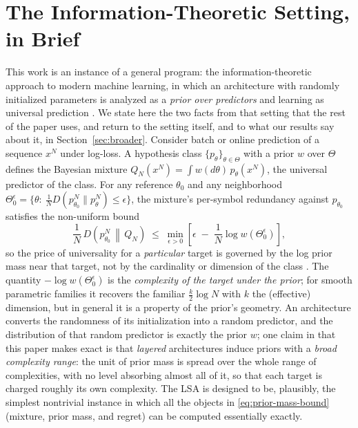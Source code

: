 \documentclass[11pt]{article}
\newcommand{\KL}{D}
\newcommand{\Nseq}{N}
\begin{document}
\section{The Information-Theoretic Setting, in Brief}
\label{sec:framework}
This work is an instance of a general program: the information-theoretic
approach to modern machine learning, in which an architecture with randomly
initialized parameters is analyzed as a \emph{prior over predictors} and
learning as universal prediction \cite{feder1992universal,MerhavFeder1998,feder2025framework}.
We state here the two facts from that setting that the rest of the paper
uses, and return to the setting itself, and to what our results say about
it, in Section~\ref{sec:broader}.
Consider batch or online prediction of a sequence \(x^\Nseq\) under log-loss.
A hypothesis class \(\{p_\theta\}_{\theta\in\Theta}\) with a prior \(w\) over
\(\Theta\) defines the Bayesian mixture
\(Q_\Nseq(x^\Nseq)=\int w(d\theta)\,p_\theta(x^\Nseq)\), the universal
predictor of the class.  For any reference \(\theta_0\) and any neighborhood
\(\Theta_0^{\epsilon}=\{\theta:\ \tfrac1\Nseq
\KL(p_{\theta_0}^\Nseq\|p_\theta^\Nseq)\le\epsilon\}\), the mixture's
per-symbol redundancy against \(p_{\theta_0}\) satisfies the non-uniform bound
\begin{equation}
\label{eq:prior-mass-bound}
  \frac1\Nseq\,\KL\!\left(p_{\theta_0}^\Nseq\,\middle\|\,Q_\Nseq\right)
  \;\le\;
\min_{\epsilon > 0}  \left[ \epsilon
  \;-\;
  \frac1\Nseq\log w\!\left(\Theta_0^{\epsilon}\right) \right ],
\end{equation}
so the price of universality for a \emph{particular} target is governed by
the log prior mass near that target, not by the cardinality or dimension of
the class \cite{feder1992universal,MerhavFeder1998,feder2025framework}.  The quantity
\(-\log w(\Theta_0^{\epsilon})\) is the \emph{complexity of the target under
the prior}; for smooth parametric families it recovers the familiar
\(\frac{k}{2}\log \Nseq\) with \(k\) the (effective) dimension, but in general
it is a property of the prior’s geometry.
An architecture converts the randomness of its initialization into a random
predictor, and the distribution of that random predictor is exactly the
prior \(w\); one claim in \cite{feder2025framework} that this paper makes
exact is that \emph{layered} architectures induce priors with a \emph{broad
complexity range}: the unit of prior mass is spread over the whole range of
complexities, with no level absorbing almost all of it, so that each target
is charged roughly its own complexity.  The LSA is
designed to be, plausibly, the simplest nontrivial instance in which all
the objects in \eqref{eq:prior-mass-bound} (mixture, prior mass, and
regret) can be computed essentially exactly.
\end{document}
